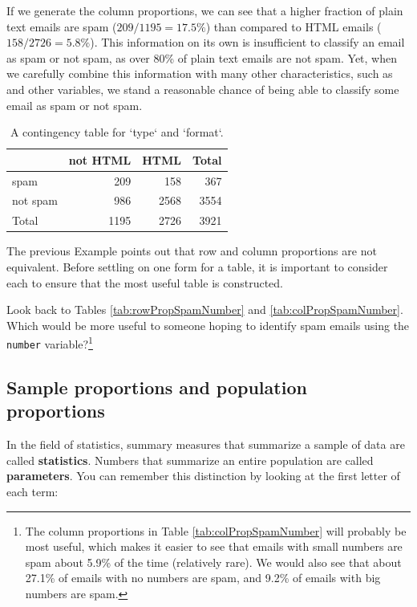 \documentclass[
  10pt,
  openany]{book}
\theoremstyle{definition}
\theoremstyle{definition}
\theoremstyle{definition}
\theoremstyle{definition}
\theoremstyle{remark}
\begin{document}
If we generate the column proportions, we can see that a higher fraction of plain text emails are spam (\(209/1195 = 17.5\%\)) than compared to HTML emails (\(158/2726 = 5.8\%\)). This information on its own is insufficient to classify an email as spam or not spam, as over 80\% of plain text emails are not spam. Yet, when we carefully combine this information with many other characteristics, such as  and other variables, we stand a reasonable chance of being able to classify some email as spam or not spam. 

\begin{table}
\centering
\caption{\label{tab:emailSpamHTMLTableTotals}A contingency table for `type` and `format`.}
\centering
\begin{tabular}[t]{l|r|r|r}
\hline
  & not HTML & HTML & Total\\
\hline
spam & 209 & 158 & 367\\
\hline
not spam & 986 & 2568 & 3554\\
\hline
Total & 1195 & 2726 & 3921\\
\hline
\end{tabular}
\end{table}

The previous Example points out that row and column proportions are not equivalent. Before settling on one form for a table, it is important to consider each to ensure that the most useful table is constructed.

Look back to Tables \ref{tab:rowPropSpamNumber} and \ref{tab:colPropSpamNumber}. Which would be more useful to someone hoping to identify spam emails using the \texttt{number} variable?\footnote{The column proportions in Table \ref{tab:colPropSpamNumber} will probably be most useful, which makes it easier to see that emails with small numbers are spam about 5.9\% of the time (relatively rare). We would also see that about 27.1\% of emails with no numbers are spam, and 9.2\% of emails with big numbers are spam.}

\subsection{Sample proportions and population proportions}\label{sample-proportions-and-population-proportions}

In the field of statistics, summary measures that summarize a sample of data are called \textbf{statistics}. Numbers that summarize an entire population are called \textbf{parameters}. You can remember
this distinction by looking at the first letter of each term:
\end{document}
